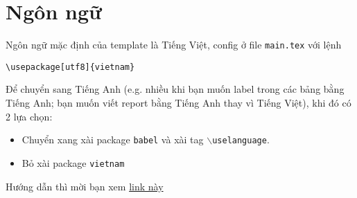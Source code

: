 \section{Ngôn ngữ}
Ngôn ngữ mặc định của template là Tiếng Việt, config ở file \texttt{main.tex} với lệnh
\begin{lstlisting}
\usepackage[utf8]{vietnam}
\end{lstlisting}
Để chuyển sang Tiếng Anh (e.g. nhiều khi bạn muốn label trong các bảng bằng Tiếng Anh; bạn muốn viết report bằng Tiếng Anh thay vì Tiếng Việt), khi đó có 2 lựa chọn:
\begin{itemize}
\item Chuyển xang xài package \texttt{babel} và xài tag \texttt{$\backslash$uselanguage}.
\item Bỏ xài package \texttt{vietnam}
\end{itemize}
Hướng dẫn thì mời bạn xem \href{https://www.overleaf.com/learn/latex/International_language_support#Babel}{link này}
